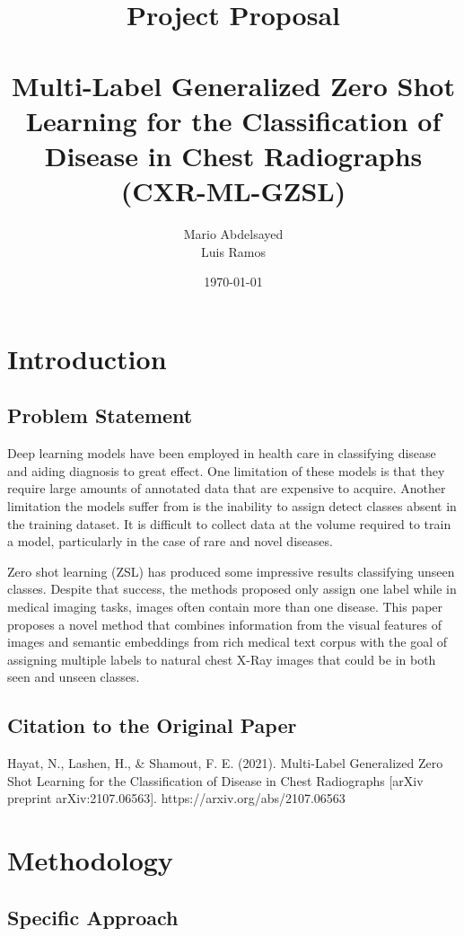 \documentclass[letterpaper]{article} %
\title{Project Proposal \\ \\ Multi-Label Generalized Zero Shot Learning for the Classification of Disease in Chest Radiographs (CXR-ML-GZSL)}
\author{
    Mario Abdelsayed\\
    Luis Ramos\\
}
\date{\today}
\begin{document}
\maketitle

\section{Introduction}

\subsection{Problem Statement}

Deep learning models have been employed in health care in classifying disease and
aiding diagnosis to great effect. One limitation of these models is that they require large
amounts of annotated data that are expensive to acquire. Another limitation the models
suffer from is the inability to assign detect classes absent in the training dataset. It is
difficult to collect data at the volume required to train a model, particularly in the
case of rare and novel diseases.

Zero shot learning (ZSL) has produced some impressive results classifying unseen
classes. Despite that success, the methods proposed only assign one label while in
medical imaging tasks, images often contain more than one disease. This paper proposes a
novel method that combines information from the visual features of images and semantic
embeddings from rich medical text corpus with the goal of assigning multiple labels to natural chest X-Ray images that could be in both seen and unseen classes.


\subsection{Citation to the Original Paper}

Hayat, N., Lashen, H., \& Shamout, F. E. (2021). Multi-Label Generalized Zero Shot Learning
for the Classification of Disease in Chest Radiographs [arXiv preprint arXiv:2107.06563].
https://arxiv.org/abs/2107.06563

\section{Methodology}

\subsection{Specific Approach}
\end{document}
